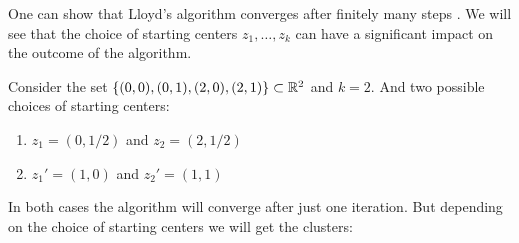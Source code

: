 One can show that Lloyd's algorithm converges after finitely many steps \cite[Thm.~3.14]{Scitovski2021}.
We will see that the choice of starting centers $z_1, \dots, z_k$ can have a significant impact on the outcome of the algorithm.

Consider the set $\{(0,0), (0,1), (2,0), (2,1)\} \subset \mathbb R^2$ and $k = 2$. And two possible choices of starting centers:

\begin{enumerate}
    \item $z_1 = (0, 1/2)$ and $z_2 = (2, 1/2)$
    \item $z_1' = (1, 0)$ and $z_2' = (1, 1)$
\end{enumerate}

In both cases the algorithm will converge after just one iteration. But depending on the choice of starting centers we will get the clusters:



